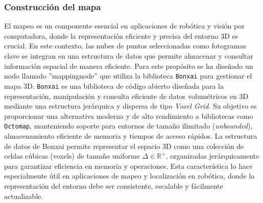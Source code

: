 \documentclass[12pt, a4paper, twoside]{article}
\begin{document}
\subsubsection{Construcción del mapa}
El mapeo es un componente esencial en aplicaciones de robótica y visión por computadora, donde la representación eficiente y precisa del entorno 3D es crucial.
En este contexto, las nubes de puntos seleccionadas como fotogramas clave se integran en una estructura de datos que permite almacenar y consultar información espacial 
de manera eficiente. Para este propósito se ha diseñado un nodo llamado ''mapping\textunderscore node'' que utiliza la biblioteca \texttt{Bonxai} para gestionar el mapa 3D.
\texttt{Bonxai} es una biblioteca de código abierto diseñada para la representación, manipulación y consulta eficiente de datos volumétricos en 3D mediante una estructura 
jerárquica y dispersa de tipo \textit{Voxel Grid}. Su objetivo es proporcionar una alternativa moderna y de alto rendimiento a bibliotecas como \texttt{Octomap}, 
manteniendo soporte para entornos de tamaño ilimitado (\textit{unbounded}), almacenamiento eficiente de memoria y tiempos de acceso rápidos.\newline
La estructura de datos de Bonxai permite representar el espacio 3D como una colección de celdas cúbicas (voxels) de tamaño uniforme \(\Delta \in \mathbb{R}^{+}\), 
organizadas jerárquicamente para garantizar eficiencia en memoria y operaciones. Esta característica lo hace especialmente útil en aplicaciones de mapeo y localización en robótica, 
donde la representación del entorno debe ser consistente, escalable y fácilmente actualizable.
\end{document}
